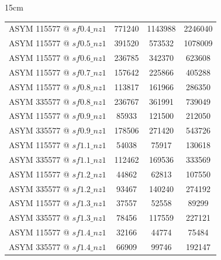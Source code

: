 \begin{table}[htbp]{15cm}
\begin{tabular}{c|c|c|c}
	ASYM 115577 @ $sf0.4\_nz1$ & 771240  & 1143988 & 2246040\\
	ASYM 115577 @ $sf0.5\_nz1$ & 391520  & 573532  & 1078009\\
	ASYM 115577 @ $sf0.6\_nz1$ & 236785  & 342370  & 623608\\
	ASYM 115577 @ $sf0.7\_nz1$ & 157642  & 225866  & 405288\\
	ASYM 115577 @ $sf0.8\_nz1$ & 113817  & 161966  & 286350\\
	ASYM 335577 @ $sf0.8\_nz1$ & 236767  & 361991  & 739049\\
	ASYM 115577 @ $sf0.9\_nz1$ & 85933   & 121500  & 212050\\
	ASYM 335577 @ $sf0.9\_nz1$ & 178506  & 271420  & 543726\\
	ASYM 115577 @ $sf1.1\_nz1$ & 54038   & 75917   & 130618\\
	ASYM 335577 @ $sf1.1\_nz1$ & 112462  & 169536  & 333569\\
	ASYM 115577 @ $sf1.2\_nz1$ & 44862   & 62813   & 107550\\
	ASYM 335577 @ $sf1.2\_nz1$ & 93467   & 140240  & 274192\\
	ASYM 115577 @ $sf1.3\_nz1$ & 37557   & 52558   & 89299\\
	ASYM 335577 @ $sf1.3\_nz1$ & 78456   & 117559  & 227121\\
	ASYM 115577 @ $sf1.4\_nz1$ & 32166   & 44774   & 75484\\
	ASYM 335577 @ $sf1.4\_nz1$ & 66909   & 99746   & 192147\\
	\hline	
\end{tabular}
	\label{tab:banks_info_DS}	
\end{table}

